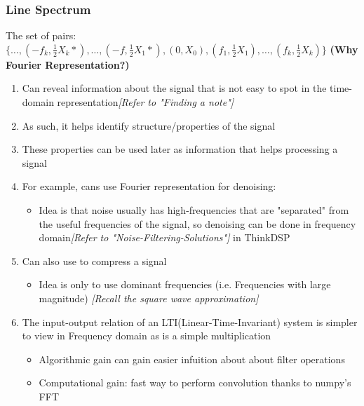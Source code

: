 \documentclass{article}
\begin{document}
            \subsubsection{Line Spectrum}
            The set of pairs:
            $\{\dots,(-f_k, \frac{1}{2}X_k*),\dots,(-f, \frac{1}{2}X_1*),(0,X_0),(f_1, \frac{1}{2}X_1),\dots,(f_k, \frac{1}{2}X_k)\}$
            \textbf{(Why Fourier Representation?)}
            \renewcommand{\labelitemi}{\textendash}
            \begin{enumerate}
                \item Can reveal information about the signal that is not easy to spot 
                in the time-domain representation\textit{[Refer to "Finding a note"]}
                \item As such, it helps identify structure/properties of the signal
                \item These properties can be used later as information that helps processing a signal
                \item For example, cans use Fourier representation for denoising:
                    \begin{itemize}
                        \item
                        Idea is that noise usually has high-frequencies that are "separated" from
                        the useful frequencies of the signal, so denoising can be done in frequency
                        domain\textit{[Refer to "Noise-Filtering-Solutions"]} in ThinkDSP
                    \end{itemize}
                \item Can also use to compress a signal
                    \begin{itemize}
                        \item
                        Idea is only to use dominant frequencies (i.e. Frequencies with large magnitude)
                        \textit{[Recall the square wave approximation]}
                    \end{itemize}
                \item The input-output relation of an LTI(Linear-Time-Invariant) system is simpler to view in
                Frequency domain as is a simple multiplication
                    \begin{itemize}
                        \item Algorithmic gain can gain easier infuition about about filter operations
                        \item Computational gain: fast way to perform convolution thanks to numpy's FFT
                    \end{itemize}
            \end{enumerate}
            \renewcommand{\labelitemi}{\textbullet}
            
\end{document}
